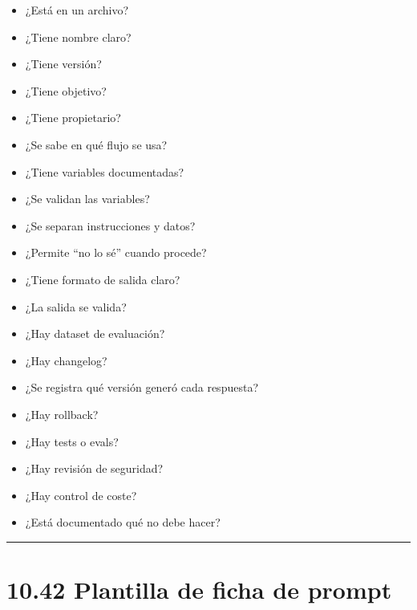 \begin{itemize}
\tightlist
\item
  ¿Está en un archivo?
\item
  ¿Tiene nombre claro?
\item
  ¿Tiene versión?
\item
  ¿Tiene objetivo?
\item
  ¿Tiene propietario?
\item
  ¿Se sabe en qué flujo se usa?
\item
  ¿Tiene variables documentadas?
\item
  ¿Se validan las variables?
\item
  ¿Se separan instrucciones y datos?
\item
  ¿Permite ``no lo sé'' cuando procede?
\item
  ¿Tiene formato de salida claro?
\item
  ¿La salida se valida?
\item
  ¿Hay dataset de evaluación?
\item
  ¿Hay changelog?
\item
  ¿Se registra qué versión generó cada respuesta?
\item
  ¿Hay rollback?
\item
  ¿Hay tests o evals?
\item
  ¿Hay revisión de seguridad?
\item
  ¿Hay control de coste?
\item
  ¿Está documentado qué no debe hacer?
\end{itemize}

\begin{center}\rule{0.5\linewidth}{0.5pt}\end{center}

\section{10.42 Plantilla de ficha de
prompt}\label{plantilla-de-ficha-de-prompt}

